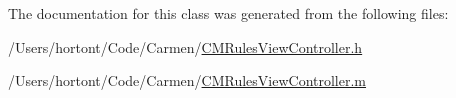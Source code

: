 The documentation for this class was generated from the following files:\begin{CompactItemize}
\item 
/Users/hortont/Code/Carmen/\hyperlink{_c_m_rules_view_controller_8h}{CMRulesViewController.h}\item 
/Users/hortont/Code/Carmen/\hyperlink{_c_m_rules_view_controller_8m}{CMRulesViewController.m}\end{CompactItemize}

